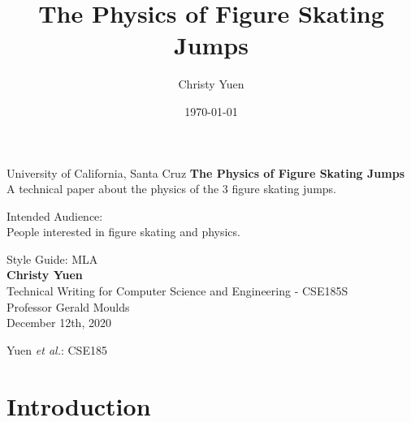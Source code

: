 \documentclass[12pt,journal,compsoc]{IEEEtran}
\begin{document}
\begin{titlepage}
	\begin{center}
	\vspace*{1cm}
	University of California, Santa Cruz
	\vfill
	\textbf{The Physics of Figure Skating Jumps}  \\
	A technical paper about the physics of the 3 figure skating jumps.
	\vfill
	
	

	Intended Audience: \\ People interested in figure skating and physics. 

	Style Guide: MLA
	\vspace{0.8cm} \\
	\textbf{Christy Yuen}  \\
	Technical Writing for Computer Science and Engineering - CSE185S  \\
	Professor Gerald Moulds \\
	December 12th, 2020
   \end{center}
\end{titlepage}

\title{The Physics of Figure Skating Jumps}
\author{Christy Yuen}
\date{\today}		%

%
{Yuen \MakeLowercase{\textit{et al.}}: CSE185}



\maketitle



\section{Introduction}
\end{document}
